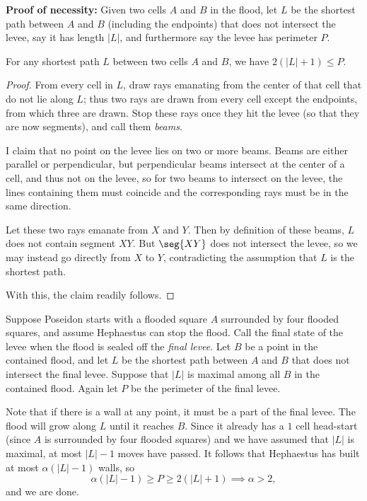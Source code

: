 \textbf{Proof of necessity:}     Given two cells $A$ and $B$ in the flood, let $L$ be the shortest path between $A$ and $B$ (including the endpoints) that does not intersect the levee, say it has length $|L|$, and furthermore say the levee has perimeter $P$.
\begin{claim*}
    For any shortest path $L$ between two cells $A$ and $B$, we have $2(|L|+1)\le P$.
\end{claim*}
\begin{proof}
    From every cell in $L$, draw rays emanating from the center of that cell that do not lie along $L$; thus two rays are drawn from every cell except the endpoints, from which three are drawn. Stop these rays once they hit the levee (so that they are now segments), and call them \emph{beams}.

    I claim that no point on the levee lies on two or more beams. Beams are either parallel or perpendicular, but perpendicular beams intersect at the center of a cell, and thus not on the levee, so for two beams to intersect on the levee, the lines containing them must coincide and the corresponding rays must be in the same direction.

    Let these two rays emanate from $X$ and $Y$. Then by definition of these beams, $L$ does not contain segment $XY$. But $\seg{XY}$ does not intersect the levee, so we may instead go directly from $X$ to $Y$, contradicting the assumption that $L$ is the shortest path.

    With this, the claim readily follows.
\end{proof}

Suppose Poseidon starts with a flooded square $A$ surrounded by four flooded squares, and assume Hephaestus can stop the flood. Call the final state of the levee when the flood is sealed off the \emph{final levee}. Let $B$ be a point in the contained flood, and let $L$ be the shortest path between $A$ and $B$ that does not intersect the final levee. Suppose that $|L|$ is maximal among all $B$ in the contained flood. Again let $P$ be the perimeter of the final levee.

Note that if there is a wall at any point, it must be a part of the final levee. The flood will grow along $L$ until it reaches $B$. Since it already has a $1$ cell head-start (since $A$ is surrounded by four flooded squares) and we have assumed that $|L|$ is maximal, at most $|L|-1$ moves have passed. It follows that Hephaestus has built at most $\alpha(|L|-1)$ walls, so \[\alpha(|L|-1)\ge P\ge2(|L|+1)\implies\alpha>2,\]
and we are done.


